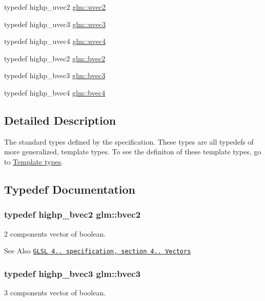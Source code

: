 \begin{DoxyCompactItemize}
\item 
typedef highp\-\_\-uvec2 \hyperlink{group__core__types_gafd2041b45eff671aa8899d2c2835eee9}{glm\-::uvec2}
\item 
typedef highp\-\_\-uvec3 \hyperlink{group__core__types_gac4ba593917841b859ba1683b8b52b8fa}{glm\-::uvec3}
\item 
typedef highp\-\_\-uvec4 \hyperlink{group__core__types_ga1c426d19627b32b14f0089f7f4ba7b1d}{glm\-::uvec4}
\item 
typedef highp\-\_\-bvec2 \hyperlink{group__core__types_ga7523cf292181cf7daef3aa0a3267d8e3}{glm\-::bvec2}
\item 
typedef highp\-\_\-bvec3 \hyperlink{group__core__types_ga3f07d6d37fc6fe875170fd5799685bcf}{glm\-::bvec3}
\item 
typedef highp\-\_\-bvec4 \hyperlink{group__core__types_ga6bb211b3d3bebae3867548d5673ca5cd}{glm\-::bvec4}
\end{DoxyCompactItemize}


\subsection{Detailed Description}
The standard types defined by the specification. These types are all typedefs of more generalized, template types. To see the definiton of these template types, go to \hyperlink{group__core__template}{Template types}. 

\subsection{Typedef Documentation}
\hypertarget{group__core__types_ga7523cf292181cf7daef3aa0a3267d8e3}{
\subsubsection[{bvec2}]{\setlength{\rightskip}{0pt plus 5cm}typedef highp\-\_\-bvec2 {\bf glm\-::bvec2}}}\label{group__core__types_ga7523cf292181cf7daef3aa0a3267d8e3}
2 components vector of boolean.

\begin{DoxySeeAlso}{See Also}
\href{http://www.opengl.org/registry/doc/GLSLangSpec.4.20.8.pdf}{\tt G\-L\-S\-L 4.. specification, section 4.. Vectors} 
\end{DoxySeeAlso}
\hypertarget{group__core__types_ga3f07d6d37fc6fe875170fd5799685bcf}{
\subsubsection[{bvec3}]{\setlength{\rightskip}{0pt plus 5cm}typedef highp\-\_\-bvec3 {\bf glm\-::bvec3}}}\label{group__core__types_ga3f07d6d37fc6fe875170fd5799685bcf}
3 components vector of boolean.


